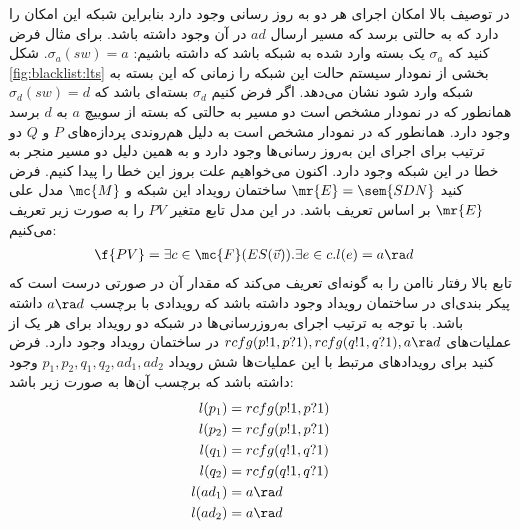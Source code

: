 در توصیف بالا امکان اجرای هر دو به روز رسانی وجود دارد
بنابراین شبکه این امکان را دارد که به حالتی برسد که مسیر ارسال
$ad$
در آن وجود داشته باشد.
برای مثال فرض کنید که
$\sigma_a$
یک بسته وارد شده به شبکه باشد که داشته باشیم:
$\sigma_a(sw) = a$.
شکل
\ref{fig:blacklist:lts}
بخشی از نمودار سیستم حالت این شبکه را زمانی که این بسته به شبکه وارد شود نشان می‌دهد.
اگر فرض کنیم
$\sigma_d$
بسته‌ای باشد که
$\sigma_d(sw) = d$
همانطور که در نمودار مشخص است دو مسیر به حالتی که بسته از سوییچ
$a$
به
$d$
برسد وجود دارد.
همانطور که در نمودار مشخص است به دلیل هم‌روندی پردازه‌های
$P$
و
$Q$
دو ترتیب برای اجرای این به‌روز رسانی‌ها وجود دارد و به همین دلیل دو مسیر منجر به خطا در این شبکه وجود دارد.
اکنون می‌خواهیم علت بروز این خطا را پیدا کنیم.
فرض کنید
$\mr{E} = \sem{SDN}$
ساختمان رویداد این شبکه و
$\mc{M}$
مدل علی
$\mr{E}$
بر اساس تعریف
باشد.
در این مدل تابع متغیر
$PV$
را به صورت زیر تعریف می‌کنیم:
\begin{align*}
    \f{PV} & = \exists c \in \mc{F}(ES(\vec v)). \exists e \in c. l(e) = a\ra d
\end{align*}
تابع بالا رفتار ناامن را به گونه‌ای تعریف می‌کند که مقدار آن در صورتی درست است که پیکر بندی‌ای در ساختمان رویداد وجود داشته باشد که رویدادی با برچسب
$a \ra d$
داشته باشد.
با توجه به ترتیب اجرای به‌روز‌رسانی‌ها در شبکه دو رویداد برای هر یک از عملیات‌های
$rcfg(p!1,p?1),rcfg(q!1,q?1),a \ra d$
در ساختمان رویداد وجود دارد.
فرض کنید برای رویداد‌های مرتبط با این عملیات‌ها شش رویداد
$p_1,p_2,q_1,q_2,ad_1,ad_2$
وجود داشته باشد که برچسب آن‌ها به صورت زیر باشد:
\begin{align*}
    l(p_1) & = rcfg(p!1,p?1) \\
    l(p_2) & = rcfg(p!1,p?1) \\
    l(q_1) & = rcfg(q!1,q?1) \\
    l(q_2) & = rcfg(q!1,q?1) \\
    l(ad_1) & = a \ra d \\
    l(ad_2) & = a \ra d 
\end{align*}

\begin{figure}
    \caption{}
    \label{fig:blacklist:es}
\end{figure}

